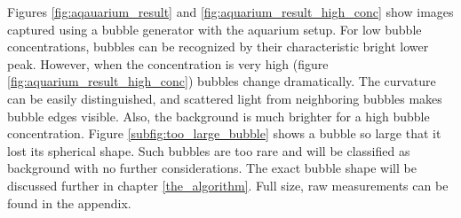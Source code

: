 			Figures \ref{fig:aqauarium_result} and \ref{fig:aquarium_result_high_conc} show images captured using a bubble generator with the aquarium setup. For low bubble concentrations, bubbles can be recognized by their characteristic bright lower peak. However, when the concentration is very high (figure \ref{fig:aquarium_result_high_conc}) bubbles change dramatically. The curvature can be easily distinguished, and scattered light from neighboring bubbles makes bubble edges visible.
			Also, the background is much brighter for a high bubble concentration. Figure \ref{subfig:too_large_bubble} shows a bubble so large that it lost its spherical shape. Such bubbles are too rare and will be classified as background with no further considerations. 
			The exact bubble shape will be discussed further in chapter \ref{the_algorithm}.	Full size, raw measurements can be found in the appendix. 
				
